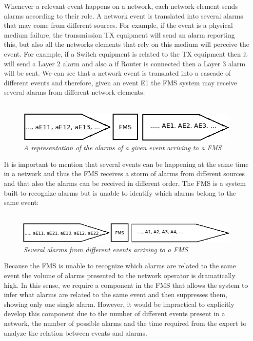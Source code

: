 \documentclass[10pt,a4paper]{article}
\begin{document}
Whenever a relevant event happens on a network, each network element sends alarms according to their role. A network event is translated into several alarms that may come from different sources. For example, if the event is a physical medium failure, the transmission TX equipment will send an alarm reporting this, but also all the networks elements that rely on this medium will perceive the event. For example, if a Switch equipment is related to the TX equipment then it will send a Layer 2 alarm and also a if Router is connected then a Layer 3 alarm will be sent. We can see that a network event is translated into a cascade of different events and therefore, given an event E1 the FMS system may receive several alarms from different network elements:
\\\\
\begin{figure}[H]
 \includegraphics[scale=0.4]{NMS_FMS_EVENT.png}
  \centering
  \caption{\textit{A representation of the alarms of a given event arriving to a FMS}}
  \label{fig:nms_fms_event}
\end{figure}	

It is important to mention that several events can be happening at the same time in a network and thus the FMS receives a storm of alarms from different sources and that also the alarms can be received in different order. The FMS is a system built to recognize alarms but is unable to identify which alarms belong to the same event:
\\\\
\begin{figure}[H]
 \includegraphics[scale=0.4]{NMS_FMS_EVENTS.png}
  \centering
  \caption{\textit{Several alarms from different events arriving to a FMS}}
  \label{fig:nms_fms_events}
\end{figure}	

Because the FMS is unable to recognize which alarms are related to the same event the volume of alarms presented to the network operator is dramatically high. In this sense, we require a component in the FMS that allows the system to infer what alarms are related to the same event and then suppresses them, showing only one single alarm. However, it would be impractical to explicitly develop this component due to the number of different events present in a network, the number of possible alarms and the time required from the expert to analyze the relation between events and alarms.
\end{document}
